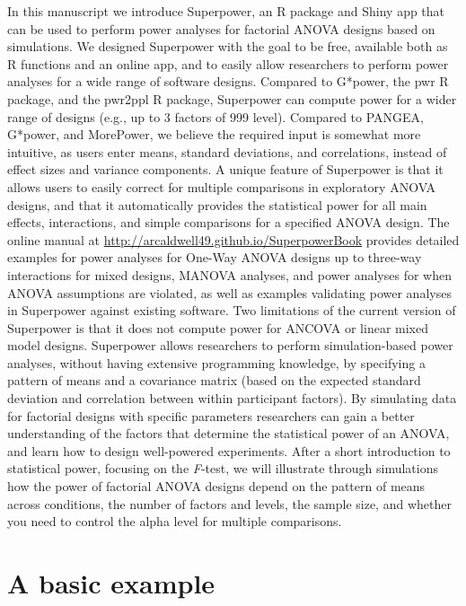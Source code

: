 \documentclass[
  ,jou,floatsintext]{apa6}
\begin{document}
In this manuscript we introduce Superpower, an R package and Shiny app that can be used to perform power analyses for factorial ANOVA designs based on simulations.
We designed Superpower with the goal to be free, available both as R functions and an online app, and to easily allow researchers to perform power analyses for a wide range of software designs.
Compared to G*power, the pwr R package, and the pwr2ppl R package, Superpower can compute power for a wider range of designs (e.g., up to 3 factors of 999 level).
Compared to PANGEA, G*power, and MorePower, we believe the required input is somewhat more intuitive, as users enter means, standard deviations, and correlations, instead of effect sizes and variance components.
A unique feature of Superpower is that it allows users to easily correct for multiple comparisons in exploratory ANOVA designs, and that it automatically provides the statistical power for all main effects, interactions, and simple comparisons for a specified ANOVA design.
The online manual at \url{http://arcaldwell49.github.io/SuperpowerBook} provides detailed examples for power analyses for One-Way ANOVA designs up to three-way interactions for mixed designs, MANOVA analyses, and power analyses for when ANOVA assumptions are violated, as well as examples validating power analyses in Superpower against existing software.
Two limitations of the current version of Superpower is that it does not compute power for ANCOVA or linear mixed model designs.
Superpower allows researchers to perform simulation-based power analyses, without having extensive programming knowledge, by specifying a pattern of means and a covariance matrix (based on the expected standard deviation and correlation between within participant factors).
By simulating data for factorial designs with specific parameters researchers can gain a better understanding of the factors that determine the statistical power of an ANOVA, and learn how to design well-powered experiments.
After a short introduction to statistical power, focusing on the \emph{F}-test, we will illustrate through simulations how the power of factorial ANOVA designs depend on the pattern of means across conditions, the number of factors and levels, the sample size, and whether you need to control the alpha level for multiple comparisons.

\hypertarget{a-basic-example}{%
\section{A basic example}\label{a-basic-example}}
\end{document}
